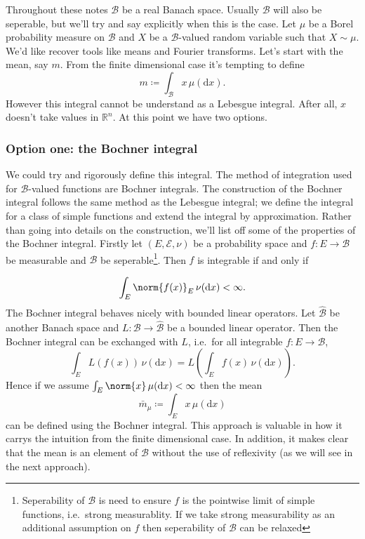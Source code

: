 \documentclass[fontsize=12pt, DIV=12]{scrreprt}
\newcommand{\defeq}{\coloneqq}
\newcommand{\R}{\mathbb R}
\newcommand{\calB}{\mathcal B}
\newcommand{\calE}{\mathcal E}
\newcommand{\dif}[1]{\text{d} #1}
\begin{document}
Throughout these notes $\calB$ be a real Banach space. Usually $\calB$ will also be seperable, but we'll try and say explicitly when this is the case. Let $\mu$ be a Borel probability measure on $\calB$ and $X$ be a $\calB$-valued random variable such that $X \sim \mu$. We'd like recover tools like means and Fourier transforms. Let's start with the mean, say $m$. From the finite dimensional case it's tempting to define
\begin{equation}
	m \defeq \int_{\calB} x \, \mu(\dif x).
\end{equation}
However this integral cannot be understand as a Lebesgue integral. After all, $x$ doesn't take values in $\R^n$. At this point we have two options.

\subsubsection{Option one: the Bochner integral}

We could try and rigorously define this integral. The method of integration used for $\calB$-valued functions are Bochner integrals. The construction of the Bochner integral follows the same method as the Lebesgue integral; we define the integral for a class of simple functions and extend the integral by approximation. Rather than going into details on the construction, we'll list off some of the properties of the Bochner integral. Firstly let $(E, \calE, \nu)$ be a probability space and $f: E \to \calB$ be measurable and $\calB$ be seperable\footnote{Seperability of $\calB$ is need to ensure $f$ is the pointwise limit of simple functions, i.e.\ strong measurablity. If we take strong measurability as an additional assumption on $f$ then seperability of $\calB$ can be relaxed}. Then $f$ is integrable if and only if

\begin{equation}
	\int_E \norm{f(x)}_E \, \nu(\dif x) < \infty.
\end{equation}
The Bochner integral behaves nicely with bounded linear operators. Let $\hat{\calB}$ be another Banach space and $L: \calB \to \hat{\calB}$ be a bounded linear operator. Then the Bochner integral can be exchanged with $L$, i.e.\ for all integrable $f: E \to \calB$,
\begin{equation}
	\int_E L(f(x)) \, \nu(\dif x) = L\left( \int_E f(x) \, \nu(\dif x)\right).
\end{equation}
Hence if we assume $\int_E \norm{x} \, \mu(\dif x) < \infty$ then the mean
\begin{equation}
	\bar{m}_{\mu} \defeq \int_E x \, \mu(\dif x)
\end{equation}
can be defined using the Bochner integral. This approach is valuable in how it carrys the intuition from the finite dimensional case. In addition, it makes clear that the mean is an element of $\calB$ without the use of reflexivity (as we will see in the next approach). 
\end{document}
